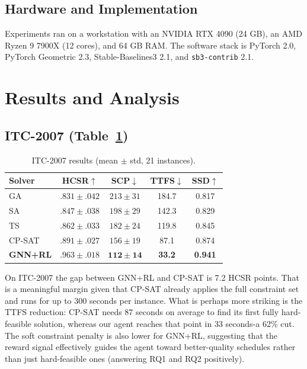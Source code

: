 \documentclass[conference]{IEEEtran}
\begin{document}
\subsection{Hardware and Implementation}

Experiments ran on a workstation with an NVIDIA RTX 4090 (24 GB), an AMD Ryzen 9 7900X (12 cores), and 64 GB RAM. The software stack is PyTorch 2.0, PyTorch Geometric 2.3, Stable-Baselines3 2.1, and \texttt{sb3-contrib} 2.1.


\section{Results and Analysis}
\label{sec:results}

\subsection{ITC-2007 (Table~\ref{tab:t1})}

\begin{table}[ht]
\centering
\caption{ITC-2007 results (mean $\pm$ std, 21 instances).}
\label{tab:t1}
\small
\begin{tabular}{lcccc}
\toprule
\textbf{Solver} & \textbf{HCSR$\uparrow$} & \textbf{SCP$\downarrow$} & \textbf{TTFS$\downarrow$} & \textbf{SSD$\uparrow$} \\
\midrule
GA      & $.831{\pm}.042$ & $213{\pm}31$ & 184.7 & 0.817 \\
SA      & $.847{\pm}.038$ & $198{\pm}29$ & 142.3 & 0.829 \\
TS      & $.862{\pm}.033$ & $182{\pm}24$ & 119.8 & 0.845 \\
CP-SAT  & $.891{\pm}.027$ & $156{\pm}19$ & 87.1  & 0.874 \\
\midrule
\textbf{GNN+RL} & $\mathbf{.963{\pm}.018}$ & $\mathbf{112{\pm}14}$ & \textbf{33.2} & \textbf{0.941} \\
\bottomrule
\end{tabular}
\end{table}

On ITC-2007 the gap between GNN+RL and CP-SAT is 7.2 HCSR points. That is a meaningful margin given that CP-SAT already applies the full constraint set and runs for up to 300 seconds per instance. What is perhaps more striking is the TTFS reduction: CP-SAT needs 87 seconds on average to find its first fully hard-feasible solution, whereas our agent reaches that point in 33 seconds-a 62\% cut. The soft constraint penalty is also lower for GNN+RL, suggesting that the reward signal effectively guides the agent toward better-quality schedules rather than just hard-feasible ones (answering RQ1 and RQ2 positively).
\end{document}
